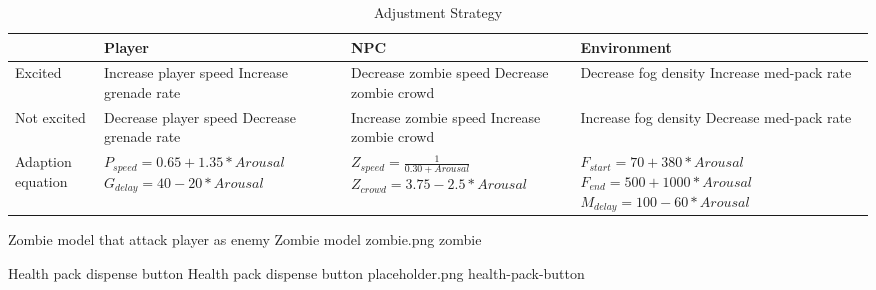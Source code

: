 \begin{table*}[!t]
\caption{Adjustment Strategy}
\label{tbl:adjustment-strategy}
\hfil
\centering
\begin{tabular}{lp{4cm}p{4cm}p{4cm}}
                     & Player                            & NPC                             & Environment \\
\hline
Excited              & Increase player speed \newline Increase grenade rate
                     & Decrease zombie speed \newline Decrease zombie crowd
                     & Decrease fog density \newline Increase med-pack rate  \\
\hline
Not excited          & Decrease player speed \newline Decrease grenade rate
                     & Increase zombie speed \newline Increase zombie crowd
                     & Increase fog density \newline Decrease med-pack rate  \\
\hline
Adaption \newline
equation             & $P_{speed} = 0.65 + 1.35 * Arousal$    \newline $G_{delay} = 40 - 20 * Arousal$
                     & $Z_{speed} = \frac{1}{0.30 + Arousal}$ \newline $Z_{crowd} = 3.75 - 2.5 * Arousal$
                     & $F_{start} = 70 + 380 * Arousal$       \newline $F_{end} = 500 + 1000 * Arousal$ \newline $M_{delay} = 100 - 60 * Arousal$ \\
\end{tabular}
\end{table*}

\largeimg
{Zombie model that attack player as enemy}
{Zombie model}
{zombie.png}
{zombie}

\largeimg
{Health pack dispense button}
{Health pack dispense button}
{placeholder.png}
{health-pack-button}



